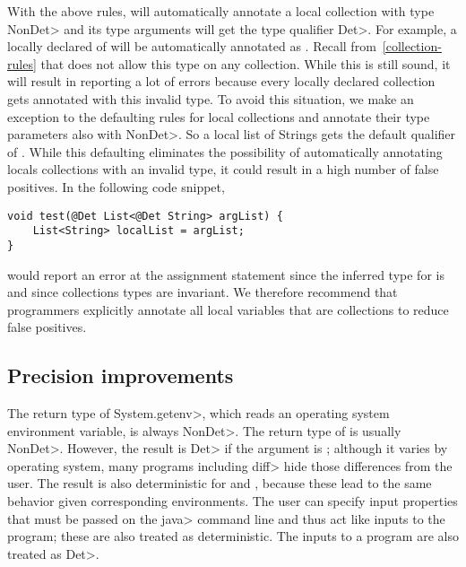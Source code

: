 With the above rules, \theDeterminismChecker will automatically annotate a local collection with type \<NonDet> and its
type arguments will get the type qualifier \<Det>. For example, a locally declared  of  will be automatically annotated
as . Recall from~\cref{collection-rules} that \theDeterminismChecker does not allow this type on
any collection. While this is still sound, it will result in \theDeterminismChecker reporting a lot of errors because every locally declared 
collection gets annotated with this invalid type. To avoid this situation, we make an exception to the defaulting rules for local collections
and annotate their type parameters also with \<NonDet>. So a local list of Strings gets the default qualifier of . While this defaulting eliminates the possibility of automatically annotating locals collections with an invalid
type, it could result in a high number of false positives. In the following code snippet,
\begin{verbatim}
void test(@Det List<@Det String> argList) {
    List<String> localList = argList;
}    
\end{verbatim}
\theDeterminismChecker would report an error at the assignment statement since the inferred type for  is 
 and since collections types are invariant.
We therefore recommend that programmers explicitly annotate
all local variables that are collections to reduce false positives.

\subsection{Precision improvements}\label{sec:precision-java}

The return type of \<System.getenv>, which reads an operating system
environment variable, is always \<NonDet>.
The return type of  is usually \<NonDet>. However,
the result is \<Det> if the argument is ; although
it varies by operating system, many programs including \<diff> hide those
differences from the user.
The result is also deterministic for  and
, because these lead to the same behavior given
corresponding environments.
The user can specify input properties that must be passed on the \<java>
command line and thus act like inputs to the program; these are also
treated as deterministic.
The inputs to a program are also treated as \<Det>.
